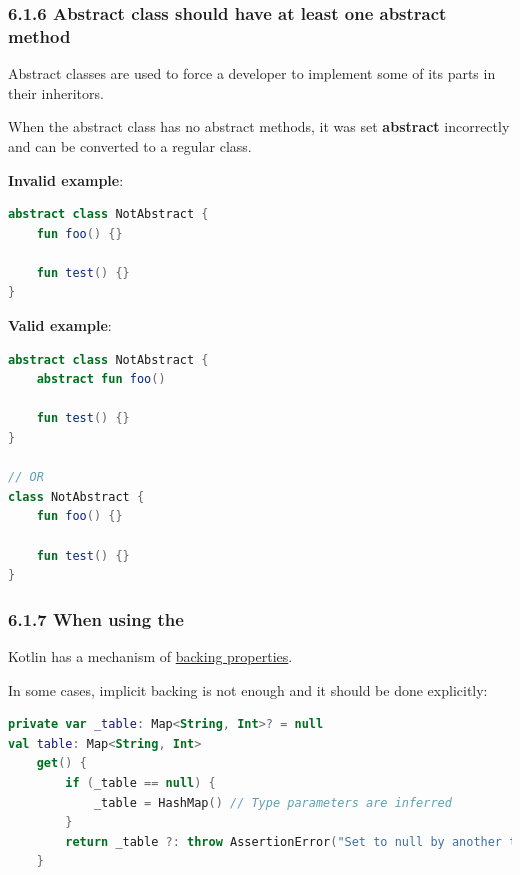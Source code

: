 \subsubsection*{\textbf{6.1.6 Abstract class should have at least one abstract method}}
\leavevmode\newline

\label{sec:6.1.6}

Abstract classes are used to force a developer to implement some of its parts in their inheritors.

When the abstract class has no abstract methods, it was set \textbf{abstract} incorrectly and can be converted to a regular class.



\textbf{Invalid example}:

\begin{lstlisting}[language=Kotlin]
abstract class NotAbstract {
    fun foo() {}
    
    fun test() {}
}
\end{lstlisting}


\textbf{Valid example}:

\begin{lstlisting}[language=Kotlin]
abstract class NotAbstract {
    abstract fun foo()
    
    fun test() {}
}

// OR
class NotAbstract {
    fun foo() {}
    
    fun test() {}
}
\end{lstlisting}




\subsubsection*{\textbf{6.1.7 When using the}}
\leavevmode\newline

\label{sec:6.1.7}

Kotlin has a mechanism of \href{https://kotlinlang.org/docs/reference/properties.html#backing-properties}{backing properties}.

In some cases, implicit backing is not enough and it should be done explicitly:

\begin{lstlisting}[language=Kotlin]
private var _table: Map<String, Int>? = null
val table: Map<String, Int>
    get() {
        if (_table == null) {
            _table = HashMap() // Type parameters are inferred
        }
        return _table ?: throw AssertionError("Set to null by another thread")
    }
\end{lstlisting}


